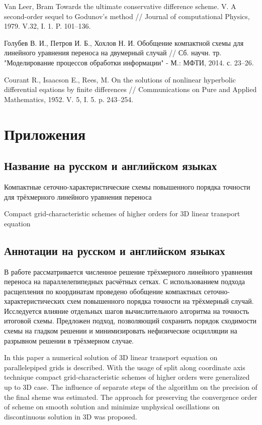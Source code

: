 \documentclass[11pt]{article}
\begin{document}
\begin{thebibliography}{99}
Van Leer, Bram Towards the ultimate conservative difference scheme. V. A second-order sequel to Godunov's method // Journal of computational Physics, 1979. V.32, I. 1. P. 101--136.

Голубев В. И., Петров И. Б., Хохлов Н. И. Обобщение компактной схемы для линейного уравнения переноса на двумерный случай // Сб. научн. тр. "Моделирование процессов обработки информации" - М.: МФТИ, 2014. с. 23--26.

Courant R., Isaacson E., Rees, M. On the solutions of nonlinear hyperbolic differential eqations by finite differences // Communications on Pure and Applied Mathematics, 1952. V. 5, I. 5. p. 243--254.

\end{thebibliography}

\section {Приложения}

\subsection {Название на русском и английском языках}

Компактные сеточно-характеристические схемы повышенного порядка точности для трёхмерного линейного уравнения переноса

Compact grid-characteristic schemes of higher orders for 3D linear transport equation

\subsection {Аннотации на русском и английском языках}
В работе рассматривается численное решение трёхмерного линейного уравнения переноса на параллелепипедных расчётных сетках.
С использованием подхода расщепления по координатам проведено обобщение компактных сеточно-характеристических схем повышенного порядка точности на трёхмерный случай.
Исследуется влияние отдельных шагов вычислительного алгоритма на точность итоговой схемы.
Предложен подход, позволяющий сохранить порядок сходимости схемы на гладком решении и минимизировать нефизические осцилляции на разрывном решении в трёхмерном случае.

In this paper a numerical solution of 3D linear transport equation on parallelepiped grids is described.
With the usage of split along coordinate axis technique compact grid-characteristic schemes of higher orders were generalized up to 3D case.
The influence of separate steps of the algorithm on the precision of the final sheme was estimated.
The approach for preserving the convergence order of scheme on smooth solution and minimize unphysical oscillations on discontinuous solution in 3D was proposed.
\end{document}
